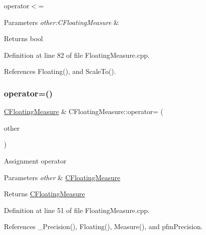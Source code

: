 operator$<$= 


\begin{DoxyParams}{Parameters}
{\em other\+:\+C\+Floating\+Measure} & \\
\hline
\end{DoxyParams}
\begin{DoxyReturn}{Returns}
bool 
\end{DoxyReturn}


Definition at line 82 of file Floating\+Measure.\+cpp.



References Floating(), and Scale\+To().

\mbox{\label{classCFloatingMeasure_a958ef3d71c3dd7355bebef272df5b9e0}} 
\subsubsection{\texorpdfstring{operator=()}{operator=()}}
{\footnotesize\ttfamily \hyperlink{classCFloatingMeasure}{C\+Floating\+Measure} \& C\+Floating\+Measure\+::operator= (\begin{DoxyParamCaption}\item[{const \hyperlink{classCFloatingMeasure}{C\+Floating\+Measure} \&}]{other }\end{DoxyParamCaption})}

Assignment operator


\begin{DoxyParams}{Parameters}
{\em other} & \hyperlink{classCFloatingMeasure}{C\+Floating\+Measure} \\
\hline
\end{DoxyParams}
\begin{DoxyReturn}{Returns}
\hyperlink{classCFloatingMeasure}{C\+Floating\+Measure} 
\end{DoxyReturn}


Definition at line 51 of file Floating\+Measure.\+cpp.



References \+\_\+\+Precision(), Floating(), Measure(), and pfm\+Precision.

\mbox{\label{classCFloatingMeasure_ab4233b1232751f99e9e1f91f2ee55cc9}} 
